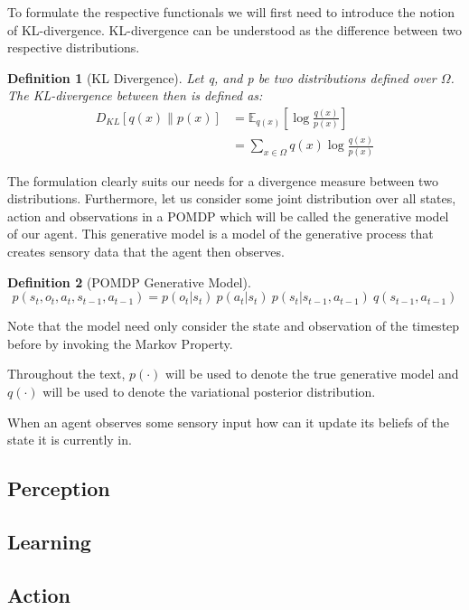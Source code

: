 \documentclass{article}
\newtheorem{definition}{Definition}
\begin{document}
To formulate the respective functionals we will first need to introduce the notion of KL-divergence. KL-divergence can be understood as the difference between two respective distributions.


\begin{definition}[KL Divergence]\label{kl_divergence}
	Let q, and p be two distributions defined over $\Omega$. The KL-divergence between then is defined as:
	\begin{align*}
		D_{KL}\left[ q(x) \| p(x) \right] &= \mathbb{E}_{q(x)}\left[ \log 
		\frac{q(x)}{p(x)} \right] \\
		&= \sum_{x \in \Omega} q(x) \log \frac{q(x)}{p(x)}
	\end{align*}
\end{definition}

The formulation clearly suits our needs for a divergence measure between two distributions. Furthermore, let us consider some joint distribution over all states, action and observations in a POMDP which will be called the generative model of our agent. This generative model is a model of the generative process that creates sensory data that the agent then observes.

\begin{definition}[POMDP Generative Model]\label{pomdp_generative_model}
$$
p(s_t, o_t, a_t, s_{t-1}, a_{t-1}) = p(o_t | s_t) \ p(a_t | s_t) \ p(s_t | s_{t-1}, a_{t-1}) \ q(s_{t-1}, a_{t-1})
$$
\end{definition} 

Note that the model need only consider the state and observation of the timestep before by invoking the Markov Property.

Throughout the text, $p(\cdot)$ will be used to denote the true generative model and $q(\cdot)$ will be used to denote the variational posterior distribution.

When an agent observes some sensory input how can it update its beliefs of the state it is currently in. 

\subsection{Perception}
\subsection{Learning}
\subsection{Action}
\end{document}
